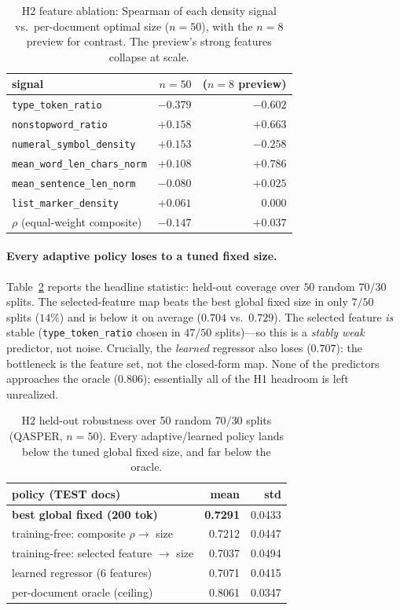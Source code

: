 \documentclass[11pt]{article}
\begin{document}
\begin{table}[t]
\centering
\caption{H2 feature ablation: Spearman of each density signal vs.\ per-document
optimal size ($n{=}50$), with the $n{=}8$ preview for contrast. The preview's
strong features collapse at scale.}
\label{tab:spearman}
\begin{tabular}{lrr}
\toprule
signal & $n{=}50$ & ($n{=}8$ preview) \\
\midrule
\texttt{type\_token\_ratio}          & $-0.379$ & $-0.602$ \\
\texttt{nonstopword\_ratio}          & $+0.158$ & $+0.663$ \\
\texttt{numeral\_symbol\_density}    & $+0.153$ & $-0.258$ \\
\texttt{mean\_word\_len\_chars\_norm}& $+0.108$ & $+0.786$ \\
\texttt{mean\_sentence\_len\_norm}   & $-0.080$ & $+0.025$ \\
\texttt{list\_marker\_density}       & $+0.061$ & $\;\;0.000$ \\
$\rho$ (equal-weight composite)      & $-0.147$ & $+0.037$ \\
\bottomrule
\end{tabular}
\end{table}

\paragraph{Every adaptive policy loses to a tuned fixed size.}
Table~\ref{tab:robust} reports the headline statistic: held-out coverage over
$50$ random $70/30$ splits. The selected-feature map beats the best global fixed
size in only $7/50$ splits ($14\%$) and is below it on average
($0.704$ vs.\ $0.729$). The selected feature \emph{is} stable
(\texttt{type\_token\_ratio} chosen in $47/50$ splits)---so this is a
\emph{stably weak} predictor, not noise. Crucially, the \emph{learned} regressor
also loses ($0.707$): the bottleneck is the feature set, not the closed-form map.
None of the predictors approaches the oracle ($0.806$); essentially all of the
H1 headroom is left unrealized.

\begin{table}[t]
\centering
\caption{H2 held-out robustness over 50 random $70/30$ splits (QASPER, $n{=}50$).
Every adaptive/learned policy lands below the tuned global fixed size, and far
below the oracle.}
\label{tab:robust}
\begin{tabular}{lrr}
\toprule
policy (TEST docs) & mean & std \\
\midrule
\textbf{best global fixed (200 tok)}       & \textbf{0.7291} & 0.0433 \\
training-free: composite $\rho \to$ size    & 0.7212 & 0.0447 \\
training-free: selected feature $\to$ size  & 0.7037 & 0.0494 \\
learned regressor (6 features)              & 0.7071 & 0.0415 \\
per-document oracle (ceiling)               & 0.8061 & 0.0347 \\
\bottomrule
\end{tabular}
\end{table}
\end{document}
